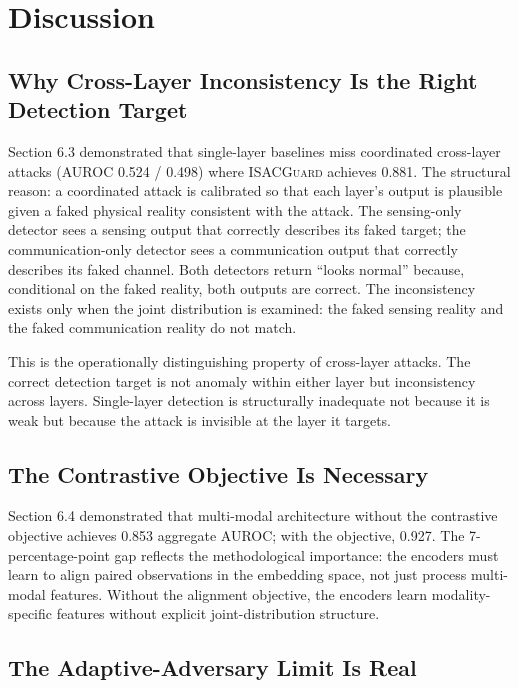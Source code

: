 \documentclass[sigconf,nonacm]{acmart}
\begin{document}
\section{Discussion}

\subsection{Why Cross-Layer Inconsistency Is the Right Detection Target}

Section 6.3 demonstrated that single-layer baselines miss
coordinated cross-layer attacks (AUROC 0.524 / 0.498) where
\textsc{ISACGuard} achieves 0.881. The structural reason: a
coordinated attack is calibrated so that each layer's output is
plausible given a faked physical reality consistent with the
attack. The sensing-only detector sees a sensing output that
correctly describes its faked target; the communication-only
detector sees a communication output that correctly describes
its faked channel. Both detectors return ``looks normal''
because, conditional on the faked reality, both outputs are
correct. The inconsistency exists only when the joint
distribution is examined: the faked sensing reality and the
faked communication reality do not match.

This is the operationally distinguishing property of cross-layer
attacks. The correct detection target is not anomaly within
either layer but inconsistency across layers. Single-layer
detection is structurally inadequate not because it is weak but
because the attack is invisible at the layer it targets.

\subsection{The Contrastive Objective Is Necessary}

Section 6.4 demonstrated that multi-modal architecture without
the contrastive objective achieves 0.853 aggregate AUROC; with
the objective, 0.927. The 7-percentage-point gap reflects the
methodological importance: the encoders must learn to align
paired observations in the embedding space, not just process
multi-modal features. Without the alignment objective, the
encoders learn modality-specific features without explicit
joint-distribution structure.

\subsection{The Adaptive-Adversary Limit Is Real}
\end{document}
